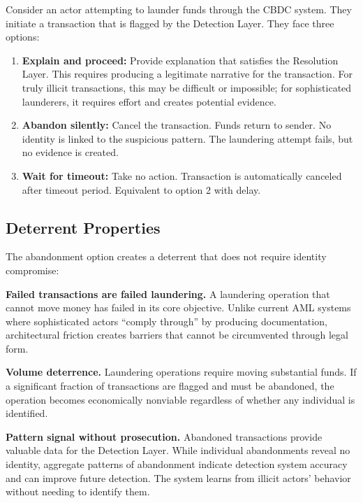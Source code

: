\documentclass[11pt]{article}
\begin{document}
Consider an actor attempting to launder funds through the CBDC system. They initiate a transaction that is flagged by the Detection Layer. They face three options:

\begin{enumerate}
    \item \textbf{Explain and proceed:} Provide explanation that satisfies the Resolution Layer. This requires producing a legitimate narrative for the transaction. For truly illicit transactions, this may be difficult or impossible; for sophisticated launderers, it requires effort and creates potential evidence.

    \item \textbf{Abandon silently:} Cancel the transaction. Funds return to sender. No identity is linked to the suspicious pattern. The laundering attempt fails, but no evidence is created.

    \item \textbf{Wait for timeout:} Take no action. Transaction is automatically canceled after timeout period. Equivalent to option 2 with delay.
\end{enumerate}

\subsection{Deterrent Properties}

The abandonment option creates a deterrent that does not require identity compromise:

\textbf{Failed transactions are failed laundering.} A laundering operation that cannot move money has failed in its core objective. Unlike current AML systems where sophisticated actors ``comply through'' by producing documentation, architectural friction creates barriers that cannot be circumvented through legal form.

\textbf{Volume deterrence.} Laundering operations require moving substantial funds. If a significant fraction of transactions are flagged and must be abandoned, the operation becomes economically nonviable regardless of whether any individual is identified.

\textbf{Pattern signal without prosecution.} Abandoned transactions provide valuable data for the Detection Layer. While individual abandonments reveal no identity, aggregate patterns of abandonment indicate detection system accuracy and can improve future detection. The system learns from illicit actors' behavior without needing to identify them.
\end{document}
